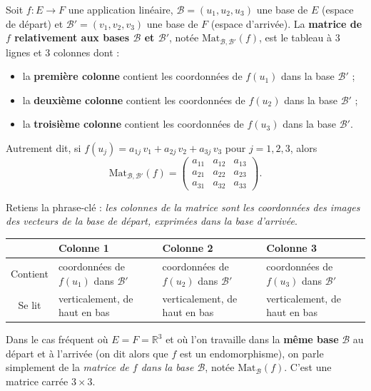 \documentclass[11pt]{article}
\newcommand{\cle}[1]{{\popxbold\color{popdark}#1}}
\begin{document}
\begin{definition}
Soit $f : E \to F$ une application linéaire, $\mathcal{B} = (u_1, u_2, u_3)$ une base de $E$ (espace de \cle{départ}) et $\mathcal{B}' = (v_1, v_2, v_3)$ une base de $F$ (espace d'\cle{arrivée}). La \textbf{matrice de $f$ relativement aux bases $\mathcal{B}$ et $\mathcal{B}'$}, notée $\mathrm{Mat}_{\mathcal{B}, \mathcal{B}'}(f)$, est le tableau à 3 lignes et 3 colonnes dont :
\begin{itemize}
\item la \textbf{première colonne} contient les coordonnées de $f(u_1)$ dans la base $\mathcal{B}'$ ;
\item la \textbf{deuxième colonne} contient les coordonnées de $f(u_2)$ dans la base $\mathcal{B}'$ ;
\item la \textbf{troisième colonne} contient les coordonnées de $f(u_3)$ dans la base $\mathcal{B}'$.
\end{itemize}
Autrement dit, si $f(u_j) = a_{1j}\,v_1 + a_{2j}\,v_2 + a_{3j}\,v_3$ pour $j = 1, 2, 3$, alors
\[ \mathrm{Mat}_{\mathcal{B}, \mathcal{B}'}(f) = \begin{pmatrix} a_{11} & a_{12} & a_{13} \\ a_{21} & a_{22} & a_{23} \\ a_{31} & a_{32} & a_{33} \end{pmatrix}. \]
\end{definition}

Retiens la phrase-clé : \emph{les colonnes de la matrice sont les coordonnées des images des vecteurs de la base de départ, exprimées dans la base d'arrivée}.

\begin{center}
\begin{tabularx}{\linewidth}{|c|X|X|X|}
\hline
\rowcolor{popblueL} & \textbf{Colonne 1} & \textbf{Colonne 2} & \textbf{Colonne 3} \\
\hline
Contient & coordonnées de $f(u_1)$ dans $\mathcal{B}'$ & coordonnées de $f(u_2)$ dans $\mathcal{B}'$ & coordonnées de $f(u_3)$ dans $\mathcal{B}'$ \\
\hline
\rowcolor{popcream} Se lit & verticalement, de haut en bas & verticalement, de haut en bas & verticalement, de haut en bas \\
\hline
\end{tabularx}
\end{center}

Dans le cas fréquent où $E = F = \mathbb{R}^3$ et où l'on travaille dans la \textbf{même base} $\mathcal{B}$ au départ et à l'arrivée (on dit alors que $f$ est un \cle{endomorphisme}), on parle simplement de la \emph{matrice de $f$ dans la base $\mathcal{B}$}, notée $\mathrm{Mat}_{\mathcal{B}}(f)$. C'est une matrice carrée $3 \times 3$.
\end{document}
